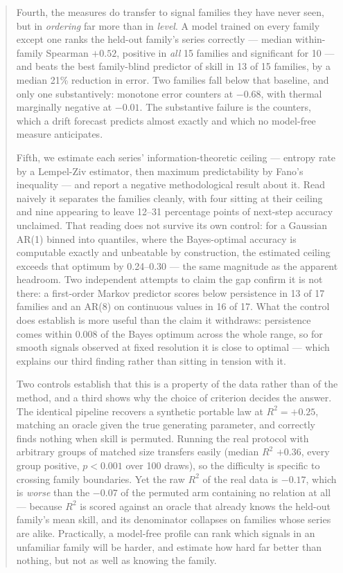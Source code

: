 \documentclass[11pt,a4paper]{article}
\newcommand{\num}[1]{#1}
\begin{document}
\begin{abstract}
Fourth, the measures do transfer to signal families they have never seen, but
in \emph{ordering} far more than in \emph{level}. A model trained on every
family except one ranks the held-out family's series correctly --- median
within-family Spearman \(+0.52\), positive in \emph{all} \num{15} families and
significant for \num{10} --- and beats the best family-blind
predictor of skill in \num{13} of \num{15} families, by a median \num{21}\%
reduction in error. Two families fall below that baseline, and only one
substantively: monotone error counters at \(-0.68\), with thermal marginally
negative at \(-0.01\). The substantive failure is the counters, which a drift
forecast predicts almost exactly and which no model-free measure anticipates.

Fifth, we estimate each series' information-theoretic ceiling --- entropy rate
by a Lempel-Ziv estimator, then maximum predictability by Fano's inequality ---
and report a negative methodological result about it. Read naively it separates
the families cleanly, with four sitting at their ceiling and nine appearing to
leave \num{12}--\num{31} percentage points of next-step accuracy unclaimed. That
reading does not survive its own control: for a Gaussian AR(1) binned into
quantiles, where the Bayes-optimal accuracy is computable exactly and unbeatable
by construction, the estimated ceiling exceeds that optimum by
\num{0.24}--\num{0.30} --- the same magnitude as the apparent headroom. Two
independent attempts to claim the gap confirm it is not there: a first-order
Markov predictor scores below persistence in \num{13} of \num{17} families and
an AR(8) on continuous values in \num{16} of \num{17}. What the control does
establish is more useful than the claim it withdraws: persistence comes within
\num{0.008} of the Bayes optimum across the whole range, so for smooth signals
observed at fixed resolution it is close to optimal --- which explains our third
finding rather than sitting in tension with it.

Two controls establish that this is a property of the data rather than of the
method, and a third shows why the choice of criterion decides the answer. The
identical pipeline recovers a synthetic portable law at \(R^2=+0.25\), matching
an oracle given the true generating parameter, and correctly finds nothing when
skill is permuted. Running the real protocol with arbitrary groups of matched
size transfers easily (median \(R^2\) \(+0.36\), every group positive,
\(p<0.001\) over \num{100} draws), so the difficulty is specific to crossing
family boundaries. Yet the raw \(R^2\) of the real data is \(-0.17\), which is
\emph{worse} than the \(-0.07\) of the permuted arm containing no relation at
all --- because \(R^2\) is scored against an oracle that already knows the
held-out family's mean skill, and its denominator collapses on families whose
series are alike. Practically, a model-free profile can rank which signals in an
unfamiliar family will be harder, and estimate how hard far better than nothing,
but not as well as knowing the family.
\end{abstract}
\end{document}
